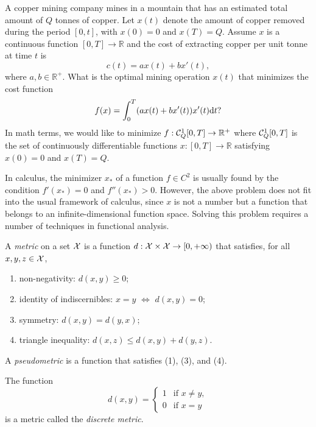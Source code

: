 \begin{exm}
  \label{exm:funcAnalExm}
  A copper mining company mines in a mountain
  that has an estimated total amount of $Q$ tonnes of copper.
  Let $x(t)$ denote the amount of copper
  removed during the period $[0,t]$,
  with $x(0)=0$ and $x(T)=Q$.
  Assume $x$ is a continuous function $[0,T]\rightarrow \mathbb{R}$
  and the cost of extracting copper per unit tonne at time $t$ is
  \begin{equation}
    \label{eq:funcAnalExm}
    c(t) = a x(t) + bx'(t),    
  \end{equation}
  where $a,b\in \mathbb{R}^+$.
  What is the optimal mining operation $x(t)$
  that minimizes the cost function
  \begin{displaymath}
    f(x) = \int_0^T (ax(t)+bx'(t))x'(t)\mathrm{d} t? 
  \end{displaymath}
  In math terms, we would like to minimize
  $f: {\cal C}^1_Q[0,T]\rightarrow \mathbb{R}^+$
  where ${\cal C}^1_Q[0,T]$ is the set
  of continuously differentiable functions
  $x: [0,T]\rightarrow \mathbb{R}$
  satisfying $x(0)=0$ and $x(T)=Q$.

  In calculus, the minimizer $x_*$
  of a function $f\in C^2$  is usually found
  by the condition $f'(x_*)=0$ and $f''(x_*)>0$.
  However, the above problem does not fit into
  the usual framework of calculus,
  since $x$ is not a number but a function
  that belongs to an infinite-dimensional
  function space.
  Solving this problem requires a number of techniques
  in functional analysis.
\end{exm}

\begin{defn}
  \label{def:metric}
  A \emph{metric} on a set ${\cal X}$ is a function
   $d:{\cal X}\times{\cal X}\rightarrow [0,+\infty)$
   that satisfies, for all $x,y,z\in {\cal X}$, 
   \begin{enumerate}[(1)]\itemsep0em
   \item non-negativity: $d(x,y)\ge 0$;
   \item identity of indiscernibles: $x=y$ $\Leftrightarrow$ $d(x,y)=0$;
   \item symmetry: $d(x,y)=d(y,x)$;
   \item triangle inequality: $d(x,z)\le d(x,y)+d(y,z)$.
   \end{enumerate}
  A \emph{pseudometric} is a function
   that satisfies (1), (3), and (4). 
\end{defn}

\begin{exm}
  \label{exm:discreteMetric}
  The function
  \begin{equation}
    \label{eq:discreteMetric}
    d(x,y)=
    \begin{cases}
      1 & \text{if } x\ne y,
      \\
      0 & \text{if } x= y
    \end{cases}
  \end{equation}
   is a metric called the \emph{discrete metric}.
\end{exm}

